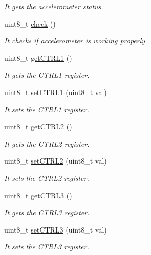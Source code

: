 \begin{DoxyCompactItemize}
\begin{DoxyCompactList}\small\item\em It gets the accelerometer status. \end{DoxyCompactList}\item 
uint8\+\_\+t \hyperlink{class_wasp_a_c_c_add13bf03ce0e0208524254bf71b9e564}{check} ()
\begin{DoxyCompactList}\small\item\em It checks if accelerometer is working properly. \end{DoxyCompactList}\item 
uint8\+\_\+t \hyperlink{class_wasp_a_c_c_afae0314979678dbab3fe122e69c7dcbd}{get\+C\+T\+R\+L1} ()
\begin{DoxyCompactList}\small\item\em It gets the C\+T\+R\+L1 register. \end{DoxyCompactList}\item 
uint8\+\_\+t \hyperlink{class_wasp_a_c_c_a9ac3f4eaae5b0a4d164e8e974d6153de}{set\+C\+T\+R\+L1} (uint8\+\_\+t val)
\begin{DoxyCompactList}\small\item\em It sets the C\+T\+R\+L1 register. \end{DoxyCompactList}\item 
uint8\+\_\+t \hyperlink{class_wasp_a_c_c_a70975c72daf9f996bebed59925707f69}{get\+C\+T\+R\+L2} ()
\begin{DoxyCompactList}\small\item\em It gets the C\+T\+R\+L2 register. \end{DoxyCompactList}\item 
uint8\+\_\+t \hyperlink{class_wasp_a_c_c_a8de00d78126d7fe9508e7e84a20edfc6}{set\+C\+T\+R\+L2} (uint8\+\_\+t val)
\begin{DoxyCompactList}\small\item\em It sets the C\+T\+R\+L2 register. \end{DoxyCompactList}\item 
uint8\+\_\+t \hyperlink{class_wasp_a_c_c_af0445fbd65a90f0930f0a50c7268646e}{get\+C\+T\+R\+L3} ()
\begin{DoxyCompactList}\small\item\em It gets the C\+T\+R\+L3 register. \end{DoxyCompactList}\item 
uint8\+\_\+t \hyperlink{class_wasp_a_c_c_a148c0664137bbb748a73b46235f60fe5}{set\+C\+T\+R\+L3} (uint8\+\_\+t val)
\begin{DoxyCompactList}\small\item\em It sets the C\+T\+R\+L3 register. \end{DoxyCompactList}\item 

\end{DoxyCompactItemize}
